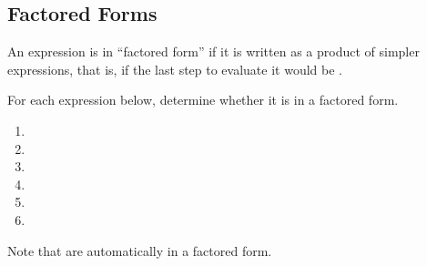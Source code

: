 \subsection{Factored Forms} 
An expression is in ``factored form'' if it is written as a product of simpler expressions, that is, if the last step to evaluate it would be \makeblank[1.5in].
\begin{Example}For each expression below, determine whether it is in a factored form.
\begin{enumerate}\setabc
\item{}
\item{}
\item{}
\item{}
\item{}
\item{}
\end{enumerate}
\end{Example}
\noindent Note that \makeblank[1.5] are automatically in a factored form.
